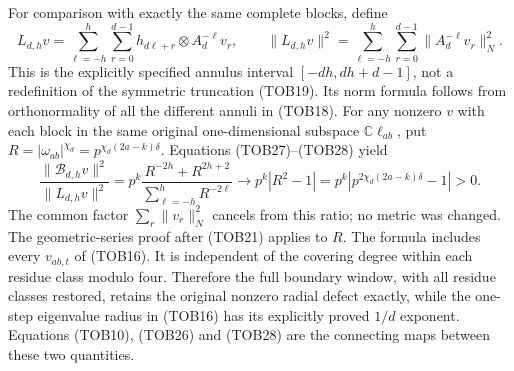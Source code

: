 For comparison with exactly the same complete blocks, define
\begin{equation}\tag{TOB28}
 L_{d,h}v=\sum_{\ell=-h}^h\sum_{r=0}^{d-1}
                  h_{d\ell+r}\otimes A_d^{-\ell}v_r,
 \qquad
 \|L_{d,h}v\|^2=\sum_{\ell=-h}^h\sum_{r=0}^{d-1}
                              \|A_d^{-\ell}v_r\|_N^2.
\end{equation}
This is the explicitly specified annulus interval
$[-dh,dh+d-1]$, not a redefinition of the symmetric truncation
(TOB19). Its norm formula follows from orthonormality of all the
different annuli in (TOB18).
For any nonzero $v$ with each block in the same original
one-dimensional subspace $\mathbb C\ell_{ab}$, put
$R=|\omega_{ab}|^{\chi_d}=p^{\chi_d(2a-k)\delta}$.
Equations (TOB27)--(TOB28) yield
\begin{equation}\tag{TOB29}
 \frac{\|\mathcal B_{d,h}v\|^2}{\|L_{d,h}v\|^2}
 =p^k\frac{R^{-2h}+R^{2h+2}}{\sum_{\ell=-h}^hR^{-2\ell}}
 \longrightarrow p^k|R^2-1|
 =p^k\left|p^{2\chi_d(2a-k)\delta}-1\right|>0.
\end{equation}
The common factor $\sum_r\|v_r\|_N^2$ cancels from this ratio;
no metric was changed. The geometric-series proof after (TOB21)
applies to $R$. The formula includes every $v_{ab,t}$ of (TOB16).
It is independent of the covering degree within each residue
class modulo four. Therefore the full boundary window, with all
residue classes restored, retains the original nonzero radial
defect exactly, while the one-step eigenvalue radius in (TOB16)
has its explicitly proved $1/d$ exponent. Equations
(TOB10), (TOB26) and (TOB28) are the connecting maps between
these two quantities.
